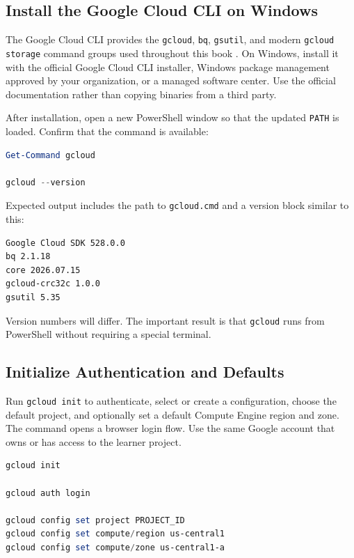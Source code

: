 \subsection{Install the Google Cloud CLI on Windows}
The Google Cloud CLI provides the \texttt{gcloud}, \texttt{bq}, \texttt{gsutil}, and modern \texttt{gcloud storage} command groups used throughout this book \cite{googlecloudclioverview}. On Windows, install it with the official Google Cloud CLI installer, Windows package management approved by your organization, or a managed software center. Use the official documentation rather than copying binaries from a third party.

After installation, open a new PowerShell window so that the updated \texttt{PATH} is loaded. Confirm that the command is available:

\begin{lstlisting}[language=PowerShell,caption={Verifying the Google Cloud CLI from Windows PowerShell.},label={lst:chapter0-gcloud-version}]
Get-Command gcloud

gcloud --version
\end{lstlisting}

Expected output includes the path to \texttt{gcloud.cmd} and a version block similar to this:

\begin{lstlisting}[language=bash,caption={Representative Google Cloud CLI version output.},label={lst:chapter0-gcloud-version-output}]
Google Cloud SDK 528.0.0
bq 2.1.18
core 2026.07.15
gcloud-crc32c 1.0.0
gsutil 5.35
\end{lstlisting}

Version numbers will differ. The important result is that \texttt{gcloud} runs from PowerShell without requiring a special terminal.

\subsection{Initialize Authentication and Defaults}
Run \texttt{gcloud init} to authenticate, select or create a configuration, choose the default project, and optionally set a default Compute Engine region and zone. The command opens a browser login flow. Use the same Google account that owns or has access to the learner project.

\begin{lstlisting}[language=PowerShell,caption={Initial Google Cloud CLI setup in PowerShell.},label={lst:chapter0-gcloud-init}]
gcloud init

gcloud auth login

gcloud config set project PROJECT_ID
gcloud config set compute/region us-central1
gcloud config set compute/zone us-central1-a
\end{lstlisting}

